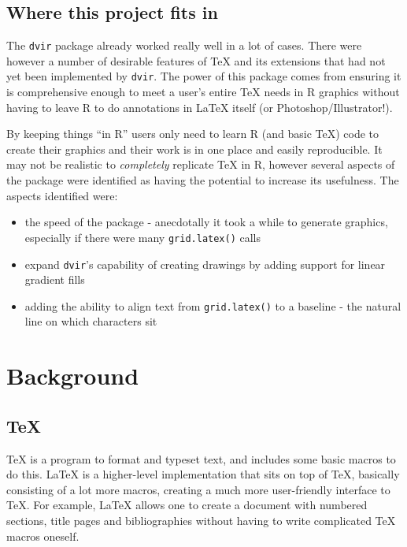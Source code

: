 \documentclass[]{article}
\providecommand{\tightlist}{%
  \setlength{\itemsep}{0pt}\setlength{\parskip}{0pt}}
\begin{document}
\subsection{Where this project fits
in}\label{where-this-project-fits-in}

The \texttt{dvir} package already worked really well in a lot of cases.
There were however a number of desirable features of \TeX{} and its
extensions that had not yet been implemented by \texttt{dvir}. The power
of this package comes from ensuring it is comprehensive enough to meet a
user's entire \TeX{} needs in R graphics without having to leave R to do
annotations in \LaTeX{} itself (or Photoshop/Illustrator!).

By keeping things ``in R'' users only need to learn R (and basic \TeX)
code to create their graphics and their work is in one place and easily
reproducible. It may not be realistic to \emph{completely} replicate
\TeX{} in R, however several aspects of the package were identified as
having the potential to increase its usefulness. The aspects identified
were:

\begin{itemize}
\tightlist
\item
  the speed of the package - anecdotally it took a while to generate
  graphics, especially if there were many \texttt{grid.latex()} calls
\item
  expand \texttt{dvir}'s capability of creating \Tikz{} drawings by
  adding support for linear gradient fills
\item
  adding the ability to align text from \texttt{grid.latex()} to a
  baseline - the natural line on which characters sit
\end{itemize}

\newpage{}

\section{Background}\label{background}

\subsection{\texorpdfstring{\TeX{}}{}}\label{section}

\TeX{} is a program to format and typeset text, and includes some basic
macros to do this. \LaTeX{} is a higher-level implementation that sits
on top of \TeX{}, basically consisting of a lot more macros, creating a
much more user-friendly interface to \TeX{}. For example, \LaTeX{}
allows one to create a document with numbered sections, title pages and
bibliographies without having to write complicated \TeX{} macros
oneself.
\end{document}
